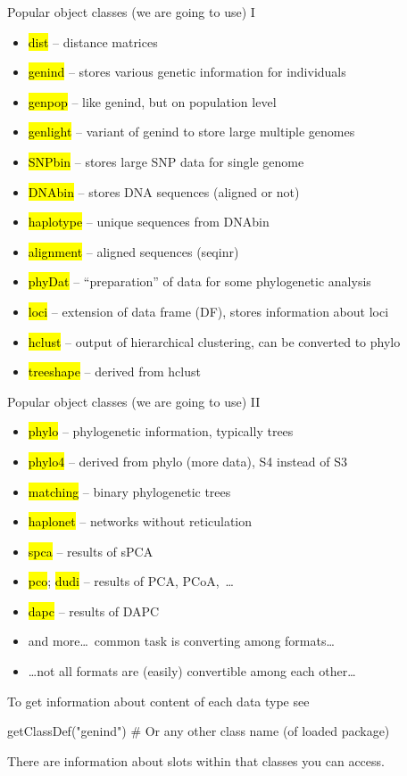 \documentclass[compress, ucs, xelatex, 11pt, xcolor=svgnames,
  hyperref={
    bookmarks=true,
    unicode=true,
    colorlinks=true,
    pdftitle={Molecular data in R},
    plainpages=false,
    pdfauthor={Vojtech Zeisek},
    pdfsubject={Course about phylogeny and evolution in R},
    pdfcreator={XeLaTeX},
    pdfkeywords={R, evolution, phylogeny, molecular data},
    linkcolor=Tomato,
    anchorcolor=SaddleBrown,
    citecolor=Goldenrod,
    filecolor=DarkMagenta,
    menucolor=Sienna,
    urlcolor=DarkTurquoise,
    pdftex},
  url={hyphens, lowtilde} %
  ]{beamer}
\renewcommand{\texttt}[1]{\hl{\ttfamily #1}}
\begin{document}
\begin{frame}{Popular object classes (we are going to use) I}
  \begin{itemize}
    \item \texttt{dist} -- distance matrices
    \item \texttt{genind} -- stores various genetic information for individuals
    \item \texttt{genpop} -- like genind, but on population level
    \item \texttt{genlight} -- variant of genind to store large multiple genomes
    \item \texttt{SNPbin} -- stores large SNP data for single genome
    \item \texttt{DNAbin} -- stores DNA sequences (aligned or not)
    \item \texttt{haplotype} -- unique sequences from DNAbin
    \item \texttt{alignment} -- aligned sequences (seqinr)
    \item \texttt{phyDat} -- ``preparation'' of data for some phylogenetic analysis
    \item \texttt{loci} -- extension of data frame (DF), stores information about loci
    \item \texttt{hclust} -- output of hierarchical clustering, can be converted to phylo
    \item \texttt{treeshape} -- derived from hclust
  \end{itemize}
\end{frame}

\begin{frame}[fragile]{Popular object classes (we are going to use) II}
  \begin{itemize}
    \item \texttt{phylo} -- phylogenetic information, typically trees
    \item \texttt{phylo4} -- derived from phylo (more data), S4 instead of S3
    \item \texttt{matching} -- binary phylogenetic trees
    \item \texttt{haplonet} -- networks without reticulation
    \item \texttt{spca} -- results of sPCA
    \item \texttt{pco}; \texttt{dudi} -- results of PCA, PCoA,~\ldots
    \item \texttt{dapc} -- results of DAPC
    \item and more\ldots~common task is converting among formats\ldots
    \item \ldots not all formats are (easily) convertible among each other\ldots
  \end{itemize}
  To get information about content of each data type see
  \begin{spluscode}
    getClassDef("genind") # Or any other class name (of loaded package)
  \end{spluscode}
  There are information about slots within that classes you can access.
\end{frame}
\end{document}
